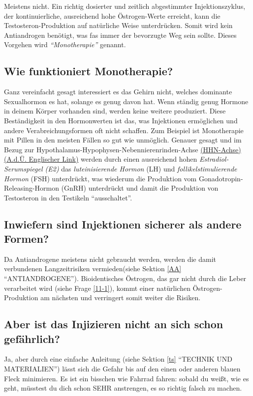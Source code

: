 \documentclass{article}
\begin{document}
Meistens nicht. Ein richtig dosierter und zeitlich abgestimmter Injektionszyklus, der kontinuierliche, ausreichend hohe Östrogen-Werte erreicht, kann die Testosteron-Produktion auf natürliche Weise unterdrücken. Somit wird kein Antiandrogen benötigt, was fas immer der bevorzugte Weg sein sollte. Dieses Vorgehen wird \textit{“Monotherapie”} genannt.

\subsection{Wie funktioniert Monotherapie?}\label{2-3}

Ganz vereinfacht gesagt interessiert es das Gehirn nicht, welches dominante Sexualhormon es hat, solange es genug davon hat. Wenn ständig genug Hormone in deinem Körper vorhanden sind, werden keine weitere produziert. Diese Beständigkeit in den Hormonwerten ist das, was Injektionen ermöglichen und andere Verabreichungsformen oft nicht schaffen. Zum Beispiel ist Monotherapie mit Pillen in den meisten Fällen so gut wie unmöglich. Genauer gesagt und im Bezug zur Hypothalamus-Hypophysen-Nebennierenrinden-Achse \href{https://en.wikipedia.org/wiki/Hypothalamic-pituitary-gonadal_axis}{(HHN-Achse) (A.d.Ü. Englischer Link)} werden durch einen ausreichend hohen \textit{Estradiol-Serumspiegel (E2)} das \textit{luteinisierende Hormon} (LH) und \textit{follikelstimulierende Hormon} (FSH) unterdrückt, was wiederum die Produktion vom Gonadotropin-Releasing-Hormon (GnRH) unterdrückt und damit die Produktion von Testosteron in den Testikeln “ausschaltet”.

\subsection{Inwiefern sind Injektionen sicherer als andere Formen?}

Da Antiandrogene meistens nicht gebraucht werden, werden die damit verbundenen Langzeitrisiken vermieden(siehe Sektion \ref{AA} “ANTIANDROGENE”). Bioidentisches Östrogen, das gar nicht durch die Leber verarbeitet wird (siehe Frage \ref{11-1}), kommt einer natürlichen Östrogen-Produktion am nächsten und verringert somit weiter die Risiken.

\subsection{Aber ist das Injizieren nicht an sich schon gefährlich?}

Ja, aber durch eine einfache Anleitung (siehe Sektion \ref{ts} “TECHNIK UND MATERIALIEN”) lässt sich die Gefahr bis auf den einen oder anderen blauen Fleck minimieren. Es ist ein bisschen wie Fahrrad fahren: sobald du weißt, wie es geht, müsstest du dich schon SEHR anstrengen, es so richtig falsch zu machen.
\end{document}

